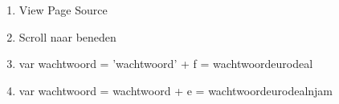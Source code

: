 \begin{enumerate}
  \item View Page Source
  \item Scroll naar beneden
  \item var wachtwoord = 'wachtwoord' + f = wachtwoordeurodeal
  \item var wachtwoord = wachtwoord + e = wachtwoordeurodealnjam
\end{enumerate}